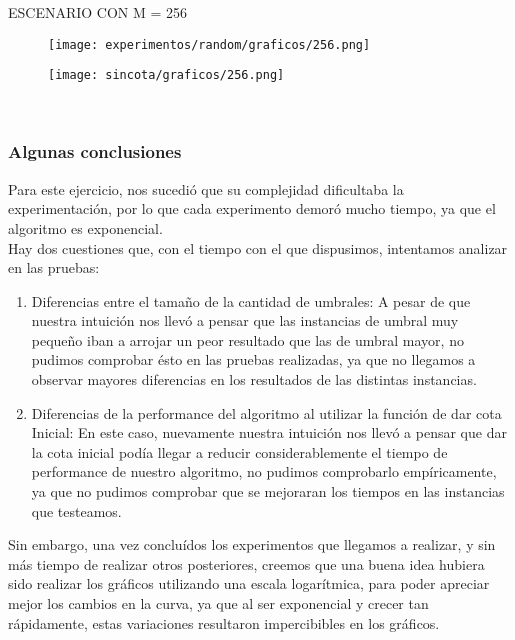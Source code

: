 \indent ESCENARIO CON M = 256
	\begin{figure}[h]
		\begin{center}
		   \texttt{[image: experimentos/random/graficos/256.png]}
		\end{center}
	\end{figure}
	\begin{figure}[h]
		\begin{center}
		   \texttt{[image: sincota/graficos/256.png]}
		\end{center}
	\end{figure} \\


\newpage \subsubsection{Algunas conclusiones}
Para este ejercicio, nos sucedió que su complejidad dificultaba la experimentación, por lo que cada experimento demoró mucho tiempo, ya que el algoritmo es exponencial.\\
Hay dos cuestiones que, con el tiempo con el que dispusimos, intentamos analizar en las pruebas:
\begin{enumerate}
\item Diferencias entre el tamaño de la cantidad de umbrales: A pesar de que nuestra intuición nos llevó a pensar que las instancias de umbral muy pequeño iban a arrojar un peor resultado que las de umbral mayor, no pudimos comprobar ésto en las pruebas realizadas, ya que no llegamos a observar mayores diferencias en los resultados de las distintas instancias.\\
\item Diferencias de la performance del algoritmo al utilizar la función de dar cota Inicial: En este caso, nuevamente nuestra intuición nos llevó a pensar que dar la cota inicial podía llegar a reducir considerablemente el tiempo de performance de nuestro algoritmo, no pudimos comprobarlo empíricamente, ya que no pudimos comprobar que se mejoraran los tiempos en las instancias que testeamos.\\
\end{enumerate}
Sin embargo, una vez concluídos los experimentos que llegamos a realizar, y sin más tiempo de realizar otros posteriores, creemos que una buena idea hubiera sido realizar los gráficos utilizando una escala logarítmica, para poder apreciar mejor los cambios en la curva, ya que al ser exponencial y crecer tan rápidamente, estas variaciones resultaron impercibibles en los gráficos.